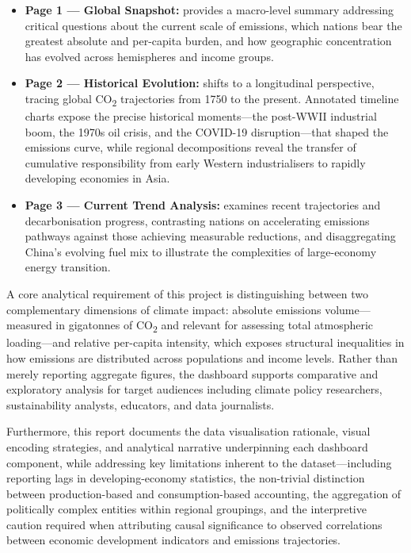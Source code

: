 \documentclass[a4paper,12pt]{article}
\begin{document}
\begin{itemize}
    \item \textbf{Page 1 --- Global Snapshot:} provides a macro-level summary addressing
    critical questions about the current scale of emissions, which nations bear the greatest
    absolute and per-capita burden, and how geographic concentration has evolved across
    hemispheres and income groups.

    \item \textbf{Page 2 --- Historical Evolution:} shifts to a longitudinal perspective,
    tracing global CO\textsubscript{2} trajectories from 1750 to the present. Annotated timeline charts
    expose the precise historical moments---the post-WWII industrial boom, the 1970s oil
    crisis, and the COVID-19 disruption---that shaped the emissions curve, while regional
    decompositions reveal the transfer of cumulative responsibility from early Western
    industrialisers to rapidly developing economies in Asia.

    \item \textbf{Page 3 --- Current Trend Analysis:} examines recent trajectories and
    decarbonisation progress, contrasting nations on accelerating emissions pathways against
    those achieving measurable reductions, and disaggregating China's evolving fuel mix to
    illustrate the complexities of large-economy energy transition.
\end{itemize}

A core analytical requirement of this project is distinguishing between two complementary
dimensions of climate impact: absolute emissions volume---measured in gigatonnes of
CO\textsubscript{2} and relevant for assessing total atmospheric loading---and relative per-capita
intensity, which exposes structural inequalities in how emissions are distributed across
populations and income levels. Rather than merely reporting aggregate figures, the dashboard
supports comparative and exploratory analysis for target audiences including climate policy
researchers, sustainability analysts, educators, and data journalists.

Furthermore, this report documents the data visualisation rationale, visual encoding
strategies, and analytical narrative underpinning each dashboard component, while addressing
key limitations inherent to the dataset---including reporting lags in developing-economy
statistics, the non-trivial distinction between production-based and consumption-based
accounting, the aggregation of politically complex entities within regional groupings, and
the interpretive caution required when attributing causal significance to observed
correlations between economic development indicators and emissions trajectories.
\end{document}
